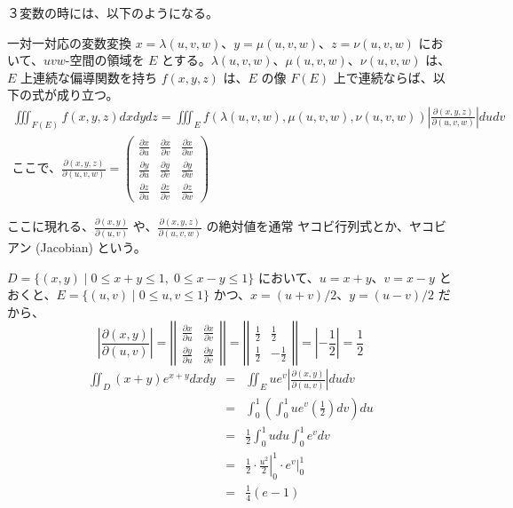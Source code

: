 ３変数の時には、以下のようになる。
\begin{thm} \label{thm:int3:change}
一対一対応の変数変換 $x = \lambda(u,v,w)$、$y= \mu(u,v,w)$、$z = \nu(u,v,w)$ において、$uvw$-空間の領域を $E$ とする。$\lambda(u,v,w)$、$\mu(u,v,w)$、$\nu(u,v,w)$ は、$E$ 上連続な偏導関数を持ち $f(x,y,z)$ は、$E$ の像 $F(E)$ 上で連続ならば、以下の式が成り立つ。
\begin{eqnarray*}
\iiint_{F(E)}f(x,y,z)dxdydz = \iiint_Ef(\lambda(u,v,w),\mu(u,v,w),\nu(u,v,w))\left|\frac{\partial(x,y,z)}{\partial(u,v,w)}\right|dudv\\
\mbox{ここで、}\frac{\partial(x,y,z)}{\partial(u,v,w)} = 
\left(\begin{array}{ccc}\frac{\partial x}{\partial u} & \frac{\partial x}{\partial v} & \frac{\partial x}{\partial w}\\ 
\frac{\partial y}{\partial u} & \frac{\partial y}{\partial v} & \frac{\partial y}{\partial w} \\
\frac{\partial z}{\partial u} & \frac{\partial z}{\partial v} & \frac{\partial z}{\partial w}\end{array}\right)
\end{eqnarray*}
\end{thm}

ここに現れる、$\frac{\partial(x,y)}{\partial(u,v)}$ や、$\frac{\partial(x,y,z)}{\partial(u,v,w)}$ の絶対値を通常 ヤコビ行列式とか、ヤコビアン (Jacobian) という。

\begin{eg}
$D = \{(x,y)\mid 0\leq x+y\leq 1, \;0\leq x-y\leq 1\}$ において、$u = x+y$、$v = x-y$ とおくと、$E = \{(u,v)\mid 0\leq u,v\leq 1\}$ かつ、$x = (u+v)/2$、$y = (u-v)/2$ だから、
$$\left|\frac{\partial(x,y)}{\partial(u,v)}\right| = \left|\left|\begin{array}{cc}\frac{\partial x}{\partial u} & \frac{\partial x}{\partial v}\\ 
\frac{\partial y}{\partial u} & \frac{\partial y}{\partial v}\end{array}\right|\right| = \left|\left|\begin{array}{cc}\frac{1}{2} & \frac{1}{2}\\ 
\frac{1}{2} & -\frac{1}{2}\end{array}\right| \right| = |-\frac12| = \frac12$$
\begin{eqnarray}
\iint_D(x+y)e^{x+y}dxdy & = & \iint_E ue^v\left|\frac{\partial(x,y)}{\partial(u,v)}\right|dudv\\
& = & \int_0^1\left(\int_0^1ue^v(\frac12)dv\right)du\\
& = & \frac12\int_0^1udu\int_0^1e^vdv \\
& = &  \frac12\cdot \left.\frac{u^2}{2}\right|^1_0\cdot \left. e^v\right|^1_0\\
& = & \frac14(e-1)
\end{eqnarray}
\end{eg} 

